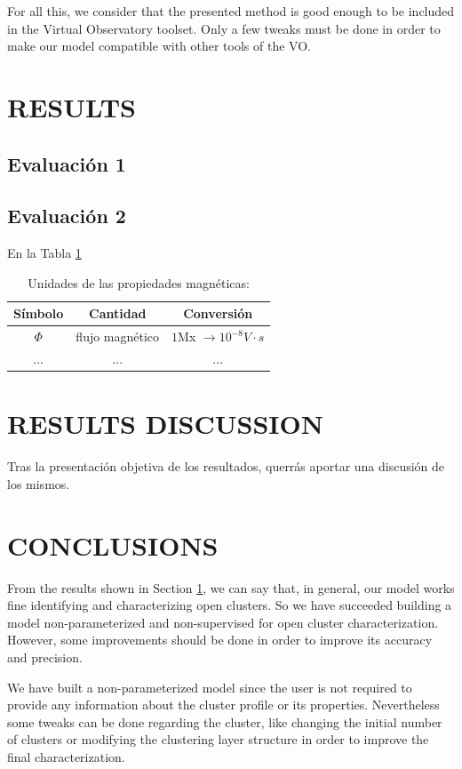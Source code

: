\documentclass[11pt,a4paper,english,twocolumn]{article}
\begin{document}
For all this, we consider that the presented method is good enough to be included
in the Virtual Observatory toolset. Only a few tweaks must be done in order to make
our model compatible with other tools of the VO.

\section{RESULTS}
\label{sec:results}

\subsection{Evaluación 1}

\subsection{Evaluación 2 }
En la Tabla \ref{tab_1}
\begin{table}\label{tab_1}
\caption{Unidades de las propiedades magnéticas:}

\begin{tabular}{ccc}\hline\hline
Símbolo & Cantidad & Conversión\\
\hline
$\Phi$ & flujo magnético & $1$Mx $\rightarrow 10^{-8}V\cdot s$\\
... &...&...\\
\hline\hline
\end{tabular}
\end{table}

\section{RESULTS DISCUSSION}

Tras la presentación objetiva de los resultados, querrás aportar una discusión de los mismos.

\section{CONCLUSIONS}

From the results shown in Section \ref{sec:results}, we can say that, in general,
our model works fine identifying and characterizing open clusters.
So we have succeeded building a model non-parameterized and non-supervised
for open cluster characterization. However, some improvements should be done
in order to improve its accuracy and precision.

We have built a non-parameterized model since the user is not required to provide
any information about the cluster profile or its properties.
Nevertheless some tweaks can be done regarding the cluster, like changing the initial
number of clusters or modifying the clustering layer structure in order to improve
the final characterization.
\end{document}
